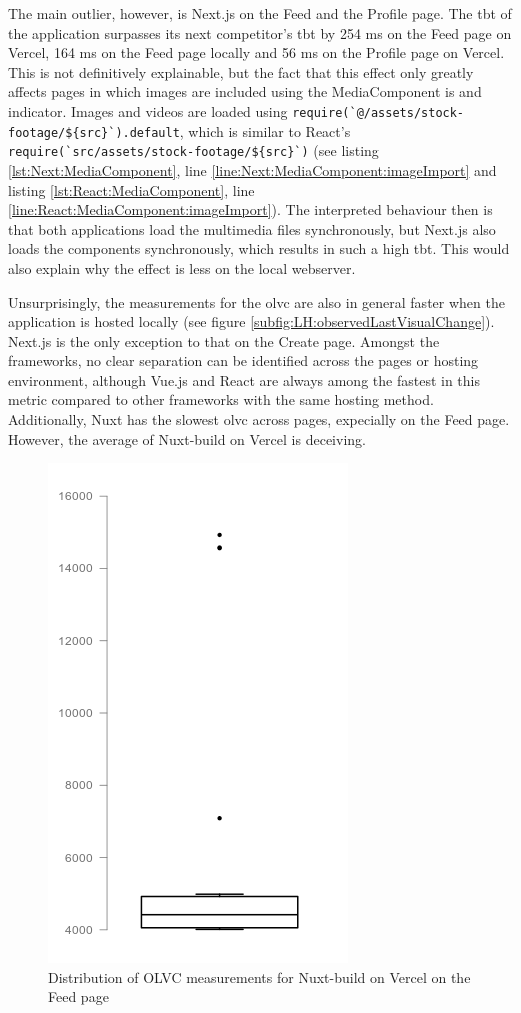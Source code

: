 \documentclass[a4paper, 10pt]{article}
\begin{document}
The main outlier, however, is Next.js on the Feed and the Profile page.
The \acrshort{tbt} of the application surpasses its next competitor's \acrshort{tbt} by 254 ms on the Feed page on Vercel, 164 ms on the Feed page locally and 56 ms on the Profile page on Vercel.
This is not definitively explainable, but the fact that this effect only greatly affects pages in which images are included using the MediaComponent is and indicator.
Images and videos are loaded using \lstinline|require(`@/assets/stock-footage/${src}`).default|, which is similar to React's \lstinline|require(`src/assets/stock-footage/${src}`)| (see listing \ref{lst:Next:MediaComponent}, line \ref{line:Next:MediaComponent:imageImport} and listing \ref{lst:React:MediaComponent}, line \ref{line:React:MediaComponent:imageImport}).
The interpreted behaviour then is that both applications load the multimedia files synchronously, but Next.js also loads the components synchronously, which results in such a high \acrlong{tbt}.
This would also explain why the effect is less on the local webserver.

Unsurprisingly, the measurements for the \acrfull{olvc} are also in general faster when the application is hosted locally (see figure \ref{subfig:LH:observedLastVisualChange}).
Next.js is the only exception to that on the Create page.
Amongst the frameworks, no clear separation can be identified across the pages or hosting environment, although Vue.js and React are always among the fastest in this metric compared to other frameworks with the same hosting method.
Additionally, Nuxt has the slowest \acrshort{olvc} across pages, expecially on the Feed page.
However, the average of Nuxt-build on Vercel is deceiving.

\begin{figure}
  \centering
  \includegraphics[width=0.5\linewidth, keepaspectratio]{img/box-plot-image.png}
  \caption{Distribution of OLVC measurements for Nuxt-build on Vercel on the Feed page}
  \label{fig:olvc-distribution}
\end{figure}
\end{document}
